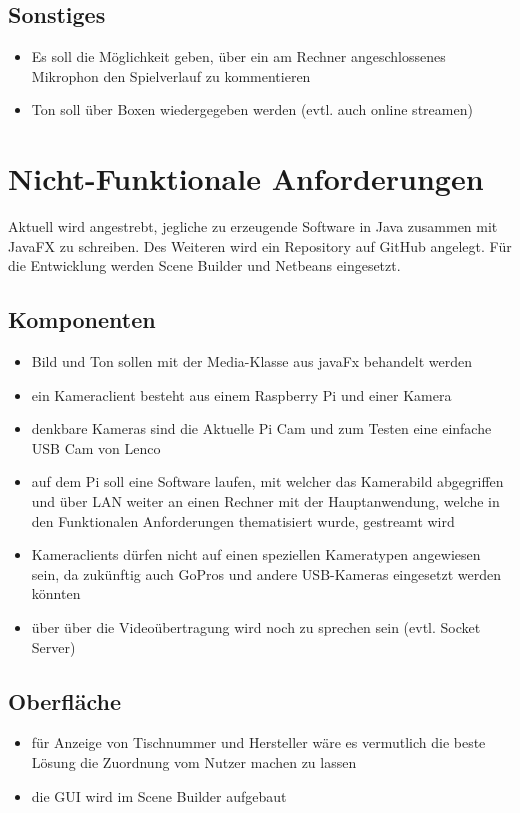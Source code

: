\documentclass[10pt,a4paper,notitlepage]{article}
\begin{document}
\subsection{Sonstiges}
\begin{itemize}
\item Es soll die Möglichkeit geben, über ein am Rechner angeschlossenes Mikrophon den Spielverlauf zu kommentieren
\item Ton soll über Boxen wiedergegeben werden (evtl. auch online streamen)
\end{itemize}
\section{Nicht-Funktionale Anforderungen}
Aktuell wird angestrebt, jegliche zu erzeugende Software in Java zusammen mit JavaFX zu schreiben. Des Weiteren wird ein Repository auf GitHub angelegt. Für die Entwicklung werden Scene Builder und Netbeans eingesetzt.
\subsection{Komponenten}
\begin{itemize}
\item Bild und Ton sollen mit der Media-Klasse aus javaFx behandelt werden
\item ein Kameraclient besteht aus einem Raspberry Pi und einer Kamera
\item denkbare Kameras sind die Aktuelle Pi Cam und zum Testen eine einfache USB Cam von Lenco
\item auf dem Pi soll eine Software laufen, mit welcher das Kamerabild abgegriffen und über LAN weiter an einen Rechner mit der Hauptanwendung, welche in den Funktionalen Anforderungen thematisiert wurde, gestreamt wird
\item Kameraclients dürfen nicht auf einen speziellen Kameratypen angewiesen sein, da zukünftig auch GoPros und andere USB-Kameras eingesetzt werden könnten
\item über über die Videoübertragung wird noch zu sprechen sein (evtl. Socket Server)
\end{itemize}
\subsection{Oberfläche}
\begin{itemize}
\item für Anzeige von Tischnummer und Hersteller wäre es vermutlich die beste Lösung die Zuordnung vom Nutzer machen zu lassen
\item die GUI wird im Scene Builder aufgebaut
\end{itemize}
\end{document}
